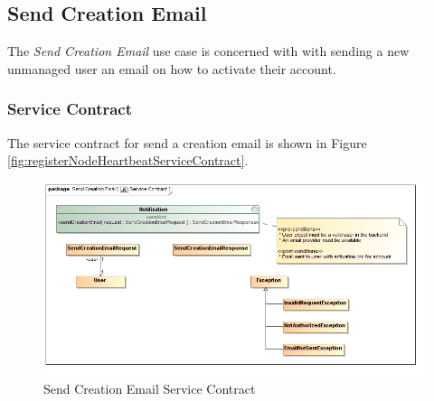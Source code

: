 \subsection{Send Creation Email}
The \textit{Send Creation Email} use case is concerned with with sending
a new unmanaged user an email on how to activate their account.

\subsubsection{Service Contract}
The service contract for send a creation email is shown in 
Figure \ref{fig:registerNodeHeartbeatServiceContract}.
\begin{figure}[H]
	\begin{center}
		\includegraphics[scale=0.38]{../Diagrams and Charts/Notifications/Send Creation Email Service Contract.jpg}
		\caption{Send Creation Email Service Contract}
		\label{fig:sendCreationEmailServiceContract}
	\end{center}
\end{figure}

